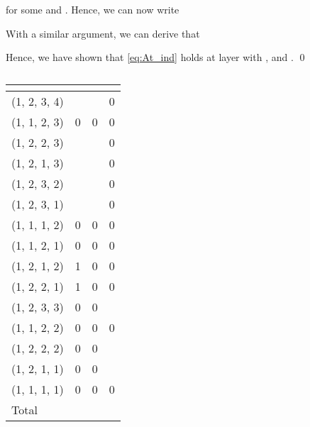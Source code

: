 \documentclass{article}
\begin{document}
for some  and . Hence, we can now write

With a similar argument, we can derive that 

Hence, we have shown that \eqref{eq:At_ind} holds at layer  with ,  and . \qed

\begin{table}[h]
\centering
\begin{tabular}{llll}
\multicolumn{1}{l|}{}        &  &  &  \\ \hline
\multicolumn{1}{l|}{(1, 2, 3, 4)} &       &         & 0             \\
\multicolumn{1}{l|}{(1, 1, 2, 3)} & 0             & 0             & 0             \\
\multicolumn{1}{l|}{(1, 2, 2, 3)} &            &              & 0             \\
\multicolumn{1}{l|}{(1, 2, 1, 3)} &            &              & 0             \\
\multicolumn{1}{l|}{(1, 2, 3, 2)} &            &              & 0             \\
\multicolumn{1}{l|}{(1, 2, 3, 1)} &            &              & 0             \\
\multicolumn{1}{l|}{(1, 1, 1, 2)} & 0             & 0             & 0             \\
\multicolumn{1}{l|}{(1, 1, 2, 1)} & 0             & 0             & 0             \\
\multicolumn{1}{l|}{(1, 2, 1, 2)} & 1             & 0             & 0             \\
\multicolumn{1}{l|}{(1, 2, 2, 1)} & 1             & 0             & 0             \\
\multicolumn{1}{l|}{(1, 2, 3, 3)} & 0             & 0             &         \\
\multicolumn{1}{l|}{(1, 1, 2, 2)} & 0             & 0             & 0             \\
\multicolumn{1}{l|}{(1, 2, 2, 2)} & 0             & 0             &              \\
\multicolumn{1}{l|}{(1, 2, 1, 1)} & 0             & 0             &              \\
\multicolumn{1}{l|}{(1, 1, 1, 1)} & 0             & 0             & 0             \\ \hline
\multicolumn{1}{l|}{Total}                             &             &             &            
\end{tabular}
\caption{}
\label{table:mE}
\end{table}
\end{document}

